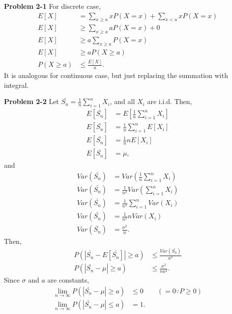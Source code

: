 \documentclass{article}
\begin{document}
\textbf{Problem 2-1}
For discrete case,
\begin{align}
    E[X] & = \sum\limits_{x \ge a} xP(X=x) + \sum\limits_{x < a} xP(X=x) \nonumber \\
    E[X] & \ge \sum\limits_{x \ge a} aP(X=x) + 0 \nonumber \\
    E[X] & \ge a \sum\limits_{x \ge a}P(X=x) \nonumber \\
    E[X] & \ge a P(X \ge a) \nonumber \\
    P(X\ge a) & \le \frac{E[X]}{a}. \nonumber
\end{align}
It is analogous for continuous case, but just replacing the summation with integral.
\bigbreak

\textbf{Problem 2-2}
Let $\bar{S_n} = \frac{1}{n}\sum\limits_{i=1}^{n}X_i$, and all $X_i$ are i.i.d. Then, 
\begin{align}
    E[\bar{S_n}] & = E[\frac{1}{n}\sum\limits_{i=1}^{n}X_i] \nonumber \\
    E[\bar{S_n}] & = \frac{1}{n}\sum\limits_{i=1}^{n}E[X_i] \nonumber \\
    E[\bar{S_n}] & = \frac{1}{n}nE[X_i] \nonumber \\
    E[\bar{S_n}] & = \mu, \nonumber
\end{align}
and
\begin{align}
    Var(\bar{S_n}) &= Var(\frac{1}{n}\sum\limits_{i=1}^{n}X_i) \nonumber \\
    Var(\bar{S_n}) &= \frac{1}{n^2}Var(\sum\limits_{i=1}^{n}X_i) \nonumber \\
    Var(\bar{S_n}) &= \frac{1}{n^2}\sum\limits_{i=1}^{n}Var(X_i) \nonumber \\
    Var(\bar{S_n}) &= \frac{1}{n^2}nVar(X_i) \nonumber \\
    Var(\bar{S_n}) &= \frac{\sigma^2}{n}. \nonumber
\end{align}
Then, 
\begin{align}
    P(|\bar{S_n} - E[\bar{S_n}]| \ge a) & \le \frac{Var(\bar{S_n})}{a^2} \nonumber \\
    P(|\bar{S_n} - \mu| \ge a) & \le \frac{\sigma^2}{na^2}. \nonumber 
\end{align}
Since $\sigma$ and $a$ are constants, 
\begin{align}
    \lim\limits_{n\rightarrow\infty}P(|\bar{S_n} - \mu| \ge a) & \le 0 \qquad (= 0\because P \ge 0)\nonumber \\
    \lim\limits_{n\rightarrow\infty}P(|\bar{S_n} - \mu| \le a) & = 1. \nonumber
\end{align}
\bigbreak
\end{document}
